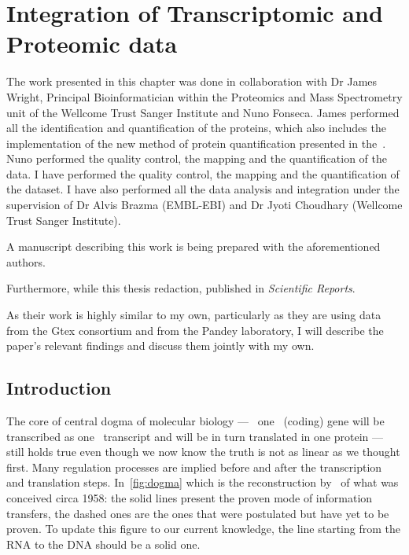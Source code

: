 \chapter{Integration of Transcriptomic and Proteomic data}
\label{ch:Integration}
The work presented in this chapter was done in collaboration with Dr James Wright,
Principal Bioinformatician within the Proteomics and Mass Spectrometry unit of the
Wellcome Trust Sanger Institute and Nuno Fonseca. James performed all the
identification and quantification of the proteins, which also includes the
implementation of the new method of protein quantification presented in
the~. Nuno performed the quality
control, the mapping and the quantification of the  data.
I have performed the quality control, the mapping and the quantification of the
 dataset. I have also performed
all the data analysis and integration under the supervision of Dr Alvis Brazma
(EMBL-EBI) and Dr Jyoti Choudhary (Wellcome Trust Sanger Institute).

A manuscript describing this work is being prepared with the aforementioned authors.

Furthermore, while this thesis redaction, \citet*{SciRep2016} published
 in \emph{Scientific Reports}.

As their work is highly similar to my own, particularly as they are using data
from the Gtex consortium and from the Pandey laboratory, I will describe the
paper's relevant findings and discuss them jointly with my own.

\section{Introduction}
\label{sec:IntegrationIntro}

The core of central dogma of molecular biology --- \ie\ one \DNA\ (coding) gene
will be transcribed as one \mRNA\ transcript and will be in turn translated in
one protein --- still holds true even though we now know the truth is not as
linear as we thought first. Many regulation processes are implied before
and after the transcription and translation steps.
In~\cref{fig:dogma} which is the reconstruction by~\citet{Crick:1958} of
what was conceived circa 1958: the solid lines present the proven mode of
information transfers, the dashed ones are the ones that were postulated but
have yet to be proven. To update this figure to our current knowledge, the line
starting from the RNA to the DNA should be a solid one.

